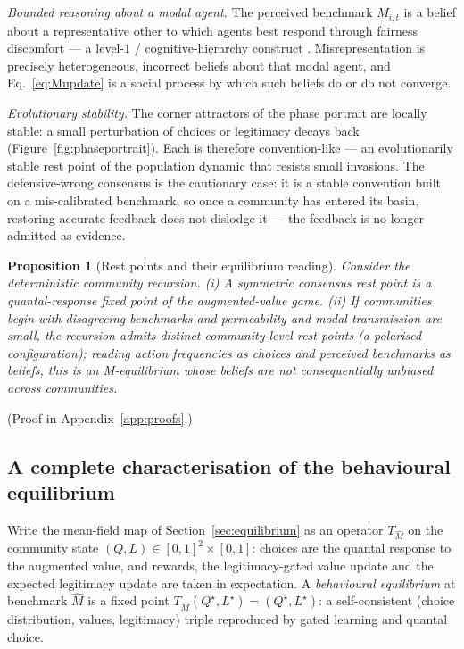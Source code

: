 \documentclass[11pt]{article}
\newtheorem{proposition}{Proposition}
\newcommand{\1}{\mathbf{1}}
\begin{document}
\emph{Bounded reasoning about a modal agent.} The perceived benchmark $\hat
M_{i,t}$ is a belief about a representative other to which agents best respond
through fairness discomfort --- a level-$1$ / cognitive-hierarchy construct
\citep{Nagel1995,StahlWilson1995,CamererHoChong2004}. Misrepresentation is
precisely heterogeneous, incorrect beliefs about that modal agent, and
Eq.~\eqref{eq:Mupdate} is a social process by which such beliefs do or do not
converge.

\emph{Evolutionary stability.} The corner attractors of the phase portrait are
locally stable: a small perturbation of choices or legitimacy decays back
(Figure~\ref{fig:phaseportrait}). Each is therefore convention-like --- an
evolutionarily stable rest point of the population dynamic that resists small
invasions. The defensive-wrong consensus is the cautionary case: it is a stable
convention built on a mis-calibrated benchmark, so once a community has entered
its basin, restoring accurate feedback does not dislodge it --- the feedback is no
longer admitted as evidence.

\begin{proposition}[Rest points and their equilibrium reading]
\label{prop:equilibrium}
Consider the deterministic community recursion. (i) A symmetric consensus rest
point is a quantal-response fixed point of the augmented-value game. (ii) If
communities begin with disagreeing benchmarks and permeability and modal
transmission are small, the recursion admits distinct community-level rest points
(a polarised configuration); reading action frequencies as choices and perceived
benchmarks as beliefs, this is an M-equilibrium whose beliefs are not
consequentially unbiased across communities.
\end{proposition}
\noindent (Proof in Appendix~\ref{app:proofs}.)

\subsection{A complete characterisation of the behavioural equilibrium}
\label{sec:characterisation}
Write the mean-field map of Section~\ref{sec:equilibrium} as an operator
$T_{\hat M}$ on the community state $(Q,L)\in[0,1]^2\times[0,1]$: choices are the
quantal response to the augmented value, and rewards, the legitimacy-gated value
update and the expected legitimacy update are taken in expectation. A
\emph{behavioural equilibrium} at benchmark $\hat M$ is a fixed point
$T_{\hat M}(Q^\star,L^\star)=(Q^\star,L^\star)$: a self-consistent
(choice distribution, values, legitimacy) triple reproduced by gated learning and
quantal choice.
\end{document}
